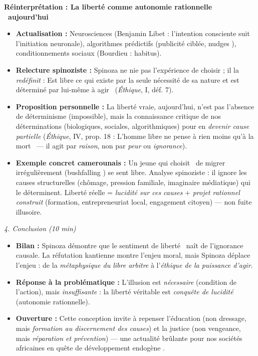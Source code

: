 \documentclass[11pt]{article}
\newcommand{\cle}[1]{{\popxbold\color{popdark}#1}}
\begin{document}
\begin{exoresolu}
\textbf{Réinterprétation : La liberté comme \guillemotleft autonomie rationnelle \guillemotright\ aujourd'hui}
\begin{itemize}
    \item \textbf{Actualisation :} Neurosciences (Benjamin Libet : l'intention consciente suit l'initiation neuronale), algorithmes prédictifs (publicité ciblée, \guillemotleft nudges \guillemotright), conditionnements sociaux (Bourdieu : \cle{habitus}).
    \item \textbf{Relecture spinoziste :} Spinoza ne nie pas l'expérience de choisir ; il la \emph{redéfinit} : \guillemotleft Est libre ce qui existe par la seule nécessité de sa nature et est déterminé par lui-même à agir \guillemotright\ (\emph{Éthique}, I, déf. 7).
    \item \textbf{Proposition personnelle :} La liberté vraie, aujourd'hui, n'est pas l'absence de déterminisme (impossible), mais la \cle{connaissance critique de nos déterminations} (biologiques, sociales, algorithmiques) pour en \emph{devenir cause partielle} (\emph{Éthique}, IV, prop. 18 : \guillemotleft L'homme libre ne pense à rien moins qu'à la mort \guillemotright\ — il agit par \emph{raison}, non par \emph{peur} ou \emph{ignorance}).
    \item \textbf{Exemple concret camerounais :} Un jeune qui \guillemotleft choisit \guillemotright\ de migrer irrégulièrement (\guillemotleft bushfalling \guillemotright) se sent libre. Analyse spinoziste : il ignore les causes structurelles (chômage, pression familiale, imaginaire médiatique) qui le déterminent. Liberté réelle = \emph{lucidité sur ces causes} + \emph{projet rationnel construit} (formation, entrepreneuriat local, engagement citoyen) — non fuite illusoire.
\end{itemize}

\emph{4. Conclusion (10 min)}
\begin{itemize}
    \item \textbf{Bilan :} Spinoza démontre que le \guillemotleft sentiment de liberté \guillemotright\ naît de l'ignorance causale. La réfutation kantienne montre l'enjeu moral, mais Spinoza déplace l'enjeu : de la \emph{métaphysique du libre arbitre} à l'\emph{éthique de la puissance d'agir}.
    \item \textbf{Réponse à la problématique :} L'illusion est \emph{nécessaire} (condition de l'action), mais \emph{insuffisante} : la liberté véritable est \emph{conquête de lucidité} (autonomie rationnelle).
    \item \textbf{Ouverture :} Cette conception invite à repenser l'éducation (non dressage, mais \emph{formation au discernement des causes}) et la justice (non vengeance, mais \emph{réparation et prévention}) — une actualité brûlante pour nos sociétés africaines en quête de \guillemotleft développement endogène \guillemotright.
\end{itemize}
\end{exoresolu}
\end{document}

